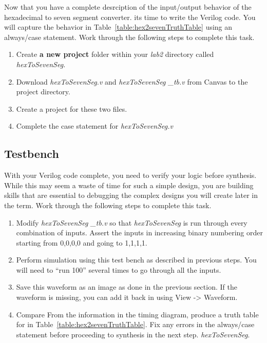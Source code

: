 Now that you have a complete desrciption of the input/output behavior 
of the hexadecimal to seven segment converter. its time to write the
Verilog code.  You will capture the behavior in Table~\ref{table:hex2sevenTruthTable}
using an always/case statement.  Work through the following steps to complete this task.
\begin{enumerate}
\item
  Create \textbf{a new project} folder within your \emph{lab2} directory
  called \emph{hexToSevenSeg.}
\item
  Download \emph{hexToSevenSeg.v} and \emph{hexToSevenSeg \_tb.v} from
  Canvas to the project directory.
\item
  Create a project for these two files.
\item
  \protect\hypertarget{Hex2Seven_Verilog}{}{}Complete the case statement
  for \emph{hexToSevenSeg.v}
  \end{enumerate}
  
  
 \subsection{Testbench}
 With your Verilog code complete, you need to verify your logic before 
 synthesis.  While this may seem a waste of time for such a simple design,
 you are building skills that are essential to debugging the complex 
 designs you will create later in the term.  Work through the following steps
 to complete this task.
 
 \begin{enumerate}
\item
  Modify \emph{hexToSevenSeg \_tb.v} so that \emph{hexToSevenSeg} is run
  through every combination of inputs. Assert the inputs in increasing
  binary numbering order starting from 0,0,0,0 and going to 1,1,1,1.
\item
  Perform simulation using this test bench as described in previous
  steps. You will need to ``run 100'' several times to go through all
  the inputs.
\item
  \protect\hypertarget{Hex2Seven_Waveform}{}{}Save this waveform as an
  image as done in the previous section. If the waveform is missing, you
  can add it back in using View -\textgreater{} Waveform.
\item
  Compare From the information in the timing diagram, produce a truth table for
  in Table~\ref{table:hex2sevenTruthTable}.  Fix any errors in the always/case statement
  before proceeding to synthesis in the next step.
  \emph{hexToSevenSeg}.
 \end{enumerate} 
  
